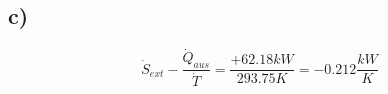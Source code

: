 

\subsection*{c)}
\[
\dot{S}_{ext} - \frac{\dot{Q}_{aus}}{\dot{T}} = \frac{+62.18 kW}{293.75 K} = -0.212 \frac{kW}{K}
\]
